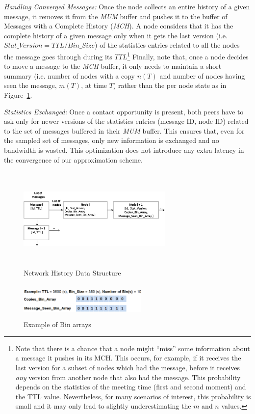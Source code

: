 \emph{Handling Converged Messages:} Once the node collects an entire history of a given message, it removes it from the \emph{MUM} buffer and pushes it to the buffer of Messages with a Complete History (\emph{MCH}). A node considers that it has the complete history of a given message only when it gets the last version (i.e. $Stat\_Version = TTL/Bin\_Size$) of the statistics entries related to all the nodes the message goes through during its $TTL$\footnote{Note that there is a chance that a node might ``miss'' some information about a message it pushes in its MCH. This occurs, for example, if it receives the last version for a subset of nodes which had the message, before it receives \emph{any} version from another node that also had the message. This probability depends on the statistics of the meeting time (first and second moment) and the TTL value. Nevertheless, for many scenarios of interest, this probability is small and it may only lead to slightly underestimating the $m$ and $n$ values.} Finally, note that, once a node decides to move a message to the \emph{MCH} buffer, it only needs to maintain a short summary (i.e. number of nodes with a copy $n(T)$ and number of nodes having seen the message, $m(T)$, at time $T$) rather than the per node state as in  Figure~\ref{NHM}.

\emph{Statistics Exchanged:} Once a contact opportunity is present, both peers have to ask only for newer versions of the statistics entries (message ID, node ID) related to the set of messages buffered in their \emph{MUM} buffer. This ensures that, even for the sampled set of messages, only new information is exchanged and no bandwidth is wasted. This optimization does not introduce any extra latency in the convergence of our approximation scheme.


\begin{figure}[!h]
\centering
\includegraphics[width=3in,height=2in]{Chapitre3/Stat_Matrix.eps}
\caption{Network History Data Structure}
\label{NHM}
\end{figure}
\begin{figure}
\centering
\includegraphics[width=2.5in,height=0.7in]{Chapitre3/Bin_Array.eps}
\caption{Example of Bin arrays}
\label{BA}
\end{figure}


